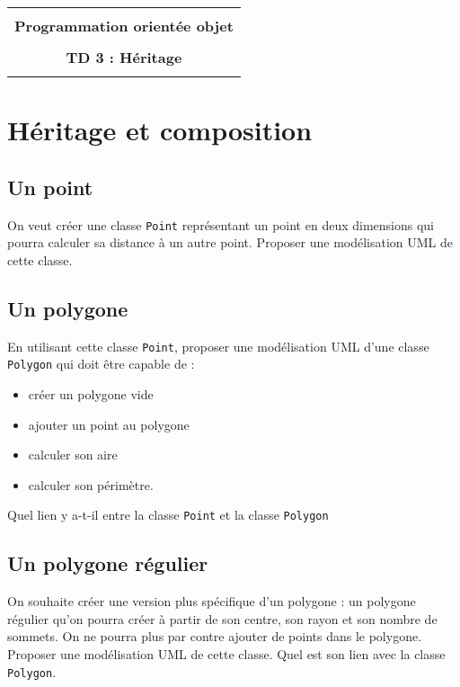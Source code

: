 \documentclass[12pt]{article}
\begin{document}
    \begin{center}
      \begin{tabular}{c}
      \hline
    \\
        {\bf \textsf {\Large Programmation orientée objet}}\\
    \\
        {\bf \textsf {\Large TD 3 : Héritage}}\\
    \\
        \hline
      \end{tabular}
    \end{center}
    \vspace{15mm}

\section{Héritage et composition}
\subsection{Un point}
On veut créer une classe \texttt{Point} représentant un point en deux dimensions qui pourra calculer sa distance à un autre point. Proposer une modélisation UML de cette classe.\\

\subsection{Un polygone}
En utilisant cette classe \texttt{Point}, proposer une modélisation UML d'une classe \texttt{Polygon} qui doit être capable de :
\begin{itemize}
	\item créer un polygone vide
	\item ajouter un point au polygone
	\item calculer son aire
	\item calculer son périmètre.
\end{itemize}
Quel lien y a-t-il entre la classe \texttt{Point} et la classe \texttt{Polygon}

\subsection{Un polygone régulier}
On souhaite créer une version plus spécifique d'un polygone : un polygone régulier qu'on pourra créer à partir de son centre, son rayon et son nombre de sommets. On ne pourra plus par contre ajouter de points dans le polygone. Proposer une modélisation UML de cette classe. Quel est son lien avec la classe \texttt{Polygon}.
\end{document}
